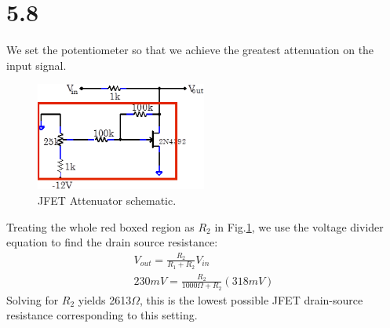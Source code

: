 \documentclass[authoryear, 12pt,5p, times]{elsarticle}
\begin{document}
  \section*{5.8}
We set the potentiometer so that we achieve the greatest attenuation on the input signal.  %
  \begin{figure}
 \centering
 \includegraphics[width=0.5\textwidth]{figure/q8setup}
\caption{JFET Attenuator schematic.}
\label{q8setup}
 \end{figure}
Treating the whole red boxed region as $R_2$ in Fig.\ref{q8setup}, we use the voltage divider equation to find the drain source resistance: 
\begin{align*}
V_{out} = \frac{R_2}{R_1+R_2}V_{in}
\\230mV = \frac{R_2}{1000\Omega+R_2}(318mV)
\label{voltage_divider}
\end{align*}
Solving for $R_2$ yields 2613$\Omega$, this is the lowest possible JFET drain-source resistance corresponding to this setting.
\end{document}
